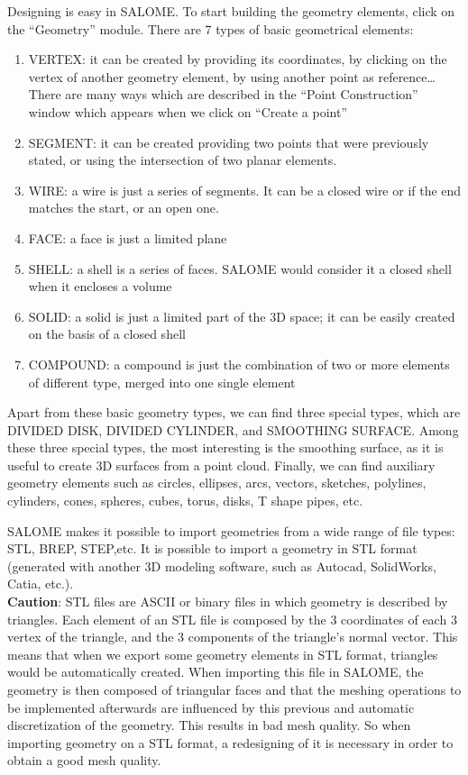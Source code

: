 Designing is easy in SALOME. To start building the geometry 
elements, click on the “Geometry” module. 
There are 7 types of basic geometrical elements:
\begin{enumerate}
\item VERTEX: it can be created by providing its coordinates, 
by clicking on the vertex of another geometry element, 
by using another point as reference…There are many ways 
which are described in the “Point Construction” window 
which appears when we click on “Create a point”
\item SEGMENT: it can be created providing two points 
that were previously stated, or using the intersection of 
two planar elements. 
\item WIRE: a wire is just a series of segments. 
It can be a closed wire or if the end matches the start, 
or an open one.
\item FACE: a face is just a limited plane 
\item SHELL: a shell is a series of faces. 
SALOME would consider it a closed shell when it 
encloses a volume
\item SOLID: a solid is just a limited part of the 3D space; 
it can be easily created on the basis of a closed shell
\item COMPOUND: a compound is just the combination 
of two or more elements of different type, merged 
into one single element
\end{enumerate}
Apart from these basic geometry types, we can find 
three special types, which are 
DIVIDED DISK, DIVIDED CYLINDER, and SMOOTHING SURFACE. 
Among these three special types, the most interesting 
is the smoothing surface, as it is useful to create 
3D surfaces from a point cloud.
Finally, we can find auxiliary geometry elements such as 
circles, ellipses, arcs, vectors, sketches, polylines, cylinders, 
cones, spheres, cubes, torus, disks, T shape pipes, etc.

SALOME makes it possible to import geometries from 
a wide range of file types: STL, BREP, STEP,etc. 
It is possible to import a geometry in STL format 
(generated with another 3D modeling software, such 
as Autocad, SolidWorks, Catia, etc.). \\

\textbf{Caution}: STL files are ASCII or binary 
files in which geometry is described by triangles. 
Each element of an STL file is composed by the 3 
coordinates of each 3 vertex of the triangle, 
and the 3 components of the triangle’s normal vector. 
This means that when we export some geometry 
elements in STL format, triangles would be automatically created. 
When importing this file in SALOME, the geometry is then 
composed of triangular faces and that the meshing operations 
to be implemented afterwards are influenced by this previous 
and automatic discretization of the geometry.
This results in bad mesh quality.
So when importing geometry on a STL format, a redesigning of it is necessary 
in order to obtain a good mesh quality.\\

